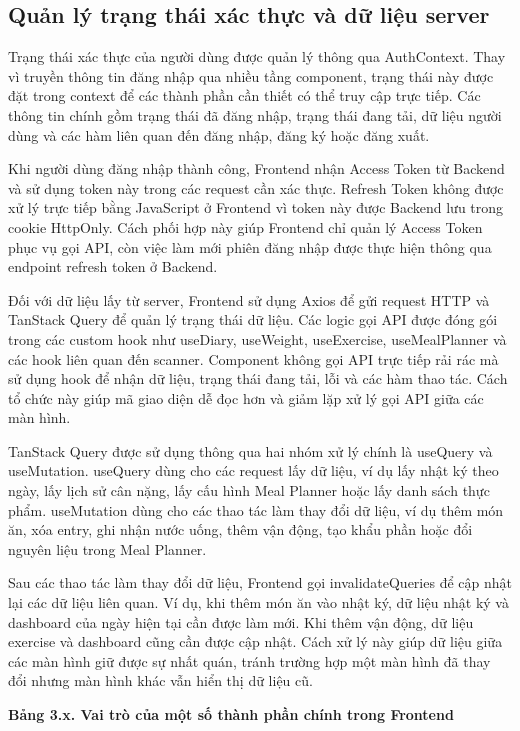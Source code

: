 \documentclass[12pt, a4paper]{report}
\begin{document}
\subsection{Quản lý trạng thái xác thực và dữ liệu server}Trạng thái xác thực của người dùng được quản lý thông qua AuthContext. Thay vì truyền thông tin đăng nhập qua nhiều tầng component, trạng thái này được đặt trong context để các thành phần cần thiết có thể truy cập trực tiếp. Các thông tin chính gồm trạng thái đã đăng nhập, trạng thái đang tải, dữ liệu người dùng và các hàm liên quan đến đăng nhập, đăng ký hoặc đăng xuất.

Khi người dùng đăng nhập thành công, Frontend nhận Access Token từ Backend và sử dụng token này trong các request cần xác thực. Refresh Token không được xử lý trực tiếp bằng JavaScript ở Frontend vì token này được Backend lưu trong cookie HttpOnly. Cách phối hợp này giúp Frontend chỉ quản lý Access Token phục vụ gọi API, còn việc làm mới phiên đăng nhập được thực hiện thông qua endpoint refresh token ở Backend.

Đối với dữ liệu lấy từ server, Frontend sử dụng Axios để gửi request HTTP và TanStack Query để quản lý trạng thái dữ liệu. Các logic gọi API được đóng gói trong các custom hook như useDiary, useWeight, useExercise, useMealPlanner và các hook liên quan đến scanner. Component không gọi API trực tiếp rải rác mà sử dụng hook để nhận dữ liệu, trạng thái đang tải, lỗi và các hàm thao tác. Cách tổ chức này giúp mã giao diện dễ đọc hơn và giảm lặp xử lý gọi API giữa các màn hình.

TanStack Query được sử dụng thông qua hai nhóm xử lý chính là useQuery và useMutation. useQuery dùng cho các request lấy dữ liệu, ví dụ lấy nhật ký theo ngày, lấy lịch sử cân nặng, lấy cấu hình Meal Planner hoặc lấy danh sách thực phẩm. useMutation dùng cho các thao tác làm thay đổi dữ liệu, ví dụ thêm món ăn, xóa entry, ghi nhận nước uống, thêm vận động, tạo khẩu phần hoặc đổi nguyên liệu trong Meal Planner.

Sau các thao tác làm thay đổi dữ liệu, Frontend gọi invalidateQueries để cập nhật lại các dữ liệu liên quan. Ví dụ, khi thêm món ăn vào nhật ký, dữ liệu nhật ký và dashboard của ngày hiện tại cần được làm mới. Khi thêm vận động, dữ liệu exercise và dashboard cũng cần được cập nhật. Cách xử lý này giúp dữ liệu giữa các màn hình giữ được sự nhất quán, tránh trường hợp một màn hình đã thay đổi nhưng màn hình khác vẫn hiển thị dữ liệu cũ.

\textbf{Bảng 3.x. Vai trò của một số thành phần chính trong Frontend}
\end{document}
